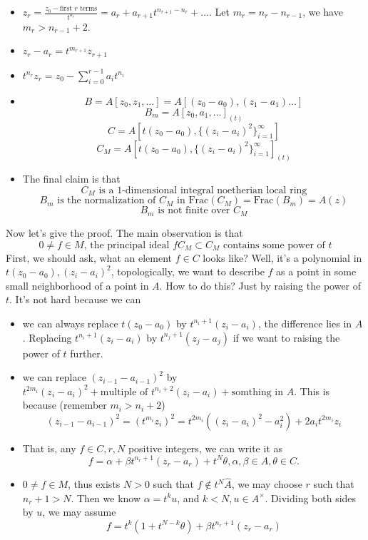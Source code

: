 \documentclass[../main.tex]{subfiles}
\begin{document}
\begin{example}
\begin{itemize}
\item $z_{r}=\frac{z_{0}-\text{first $r$ terms}}{t^{n_{r}}}=a_{r}+a_{r+1}t^{n_{r+1}-n_{r}}+\dots$. Let $m_{r}=n_{r}-n_{r-1}$, we have $m_{r}>n_{r-1}+2$.
\item $z_{r}-a_{r}=t^{m_{r+1}}z_{r+1}$
\item $t^{n_{r}}z_{r}=z_{0}-\sum_{i=0}^{r-1}a_{i}t^{n_{i}}$
\item $$B=A[z_{0}, z_{1},\dots ]=A[(z_{0}-a_{0}), (z_{1}-a_{1})\dots ]$$
$$B_{m}=A[z_{0},a_{1},\dots ]_{(t)}$$
$$C=A[t(z_{0}-a_{0}), \{(z_{i}-a_{i})^{2}\}_{i=1}^{\infty}]$$
$$C_{M}=A[t(z_{0}-a_{0}), \{(z_{i}-a_{i})^{2}\}_{i=1}^{\infty}]_{(t)}$$
\item The final claim is that 
$$\text{$C_{M}$ is a $1$-dimensional integral noetherian local ring} $$
$$\text{$B_{m}$ is the normalization of $C_{M}$ in $\mathrm{Frac}(C_{M})=\mathrm{Frac}(B_{m})=A(z)$}$$
$$\text{$B_{m}$ is not finite over $C_{M}$}$$
\end{itemize}
Now let's give the proof. The main observation is that 
$$\text{$0\neq f\in M$, the principal ideal $fC_{M}\subset C_{M}$ contains some power of $t$}$$
First, we should ask, what an element  $f\in C$ looks like? Well, it's a polynomial in $t(z_{0}-a_{0}), (z_{i}-a_{i})^{2}$, topologically, we want to describe $f$ as a point in some small neighborhood of a point in $A$. How to do this? Just by raising the power of $t$. It's not hard because we can 
\begin{itemize}
\item  we can always replace $t(z_{0}-a_{0})$ by $t^{n_{i}+1}(z_{i}-a_{i})$, the difference lies in $A$. Replacing $t^{n_{i}+1}(z_{i}-a_{i})$ by $t^{n_{j}+1}(z_{j}-a_{j})$ if we want to raising the power of $t$ further. 
\item we can replace $(z_{i-1}-a_{i-1})^{2}$ by $t^{2m_{i}}(z_{i}-a_{i})^{2}+\text{multiple of } t^{n_{i}+2}(z_{i}-a_{i})+\text{somthing in $A$}$. This is because (remember $m_{i}>n_{i}+2$)
$$(z_{i-1}-a_{i-1})^{2}=(t^{m_{i}}z_{i})^{2}=t^{2m_{i}}((z_{i}-a_{i})^{2}-a_{i}^{2})+2a_{i}t^{2m_{i}}z_{i}$$
\item That is, any $f\in C, r, N$ positive integers, we can write it as 
$$f=\alpha+\beta t^{n_{r}+1}(z_{r}-a_{r})+t^{N}\theta, \alpha,\beta\in A, \theta\in C.$$
\item $0\neq f\in M$, thus exists $N>0$ such that $f\notin t^{N}\hat{A}$, we may choose $r$ such that $n_{r}+1>N$. Then we know $\alpha=t^{k}u$, and $k<N, u\in A^{\times}$. Dividing both sides by $u$, we may assume 
$$f=t^{k}(1+t^{N-k}\theta)+\beta t^{n_{r}+1}(z_{r}-a_{r})$$

\end{itemize}
\end{example}
\end{document}
